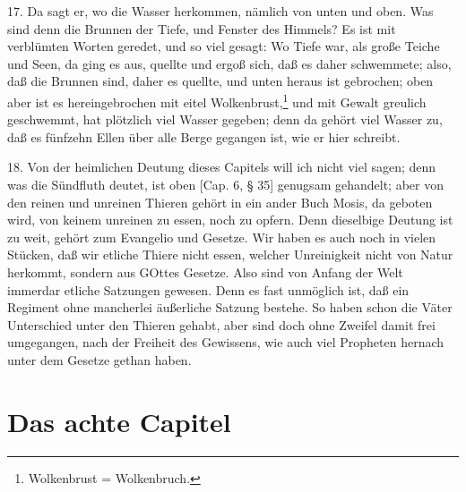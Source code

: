 17. Da sagt er, wo die Wasser herkommen, nämlich von unten und oben. Was sind denn die Brunnen der Tiefe, und Fenster des Himmels? Es ist mit verblümten Worten geredet, und so viel gesagt: Wo Tiefe war, als große Teiche und Seen, da ging es aus, quellte und ergoß sich, daß es daher schwemmete; also, daß die Brunnen sind, daher es quellte, und unten heraus ist gebrochen; oben aber ist es hereingebrochen mit eitel Wolkenbrust,\footnote{Wolkenbrust = Wolkenbruch.} und mit Gewalt greulich geschwemmt, hat plötzlich viel Wasser gegeben; denn da gehört viel Wasser zu, daß es fünfzehn Ellen über alle Berge gegangen ist, wie er hier schreibt.

18. Von der heimlichen Deutung dieses Capitels will ich nicht viel sagen; denn was die Sündfluth deutet, ist oben [Cap. 6, § 35] genugsam gehandelt; aber von den reinen und unreinen Thieren gehört in ein ander Buch Mosis, da geboten wird, von keinem unreinen zu essen, noch zu opfern. Denn dieselbige Deutung ist zu weit, gehört zum Evangelio und Gesetze. Wir haben es auch noch in vielen Stücken, daß wir etliche Thiere nicht essen, welcher Unreinigkeit nicht von Natur herkommt, sondern aus GOttes Gesetze. Also sind von Anfang der Welt immerdar etliche Satzungen gewesen. Denn es fast unmöglich ist, daß ein Regiment ohne mancherlei äußerliche Satzung bestehe. So haben schon die Väter Unterschied unter den Thieren gehabt, aber sind doch ohne Zweifel damit frei umgegangen, nach der Freiheit des Gewissens, wie auch viel Propheten hernach unter dem Gesetze gethan haben.

\section{Das achte Capitel}

